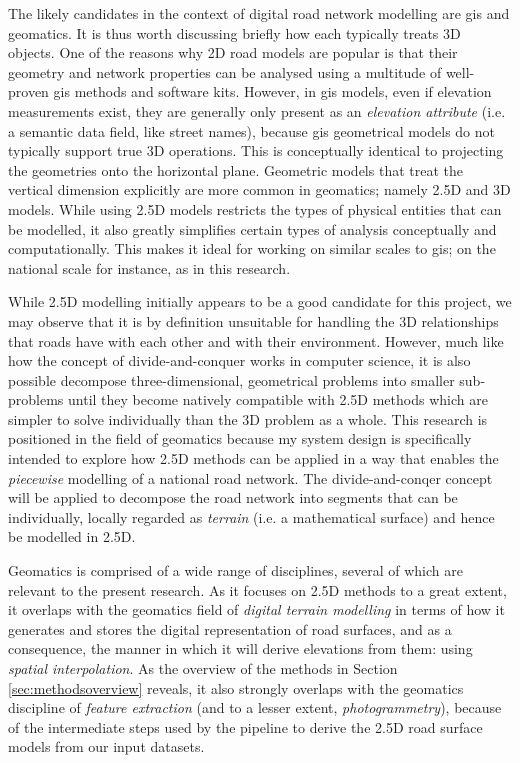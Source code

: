 The likely candidates in the context of digital road network modelling are \ac{gis} and geomatics. It is thus worth discussing briefly how each typically treats 3D objects. One of the reasons why 2D road models are popular is that their geometry and network properties can be analysed using a multitude of well-proven \ac{gis} methods and software kits. However, in \ac{gis} models, even if elevation measurements exist, they are generally only present as an \textit{elevation attribute} (i.e. a semantic data field, like street names), because \ac{gis} geometrical models do not typically support true 3D operations. This is conceptually identical to projecting the geometries onto the horizontal plane. Geometric models that treat the vertical dimension explicitly are more common in geomatics; namely 2.5D and 3D models. While using 2.5D models restricts the types of physical entities that can be modelled, it also greatly simplifies certain types of analysis conceptually and computationally. This makes it ideal for working on similar scales to \ac{gis}; on the national scale for instance, as in this research.

While 2.5D modelling initially appears to be a good candidate for this project, we may observe that it is by definition unsuitable for handling the 3D relationships that roads have with each other and with their environment. However, much like how the concept of divide-and-conquer works in computer science, it is also possible decompose three-dimensional, geometrical problems into smaller sub-problems until they become natively compatible with 2.5D methods which are simpler to solve individually than the 3D problem as a whole. This research is positioned in the field of geomatics because my system design is specifically intended to explore how 2.5D methods can be applied in a way that enables the \textit{piecewise} modelling of a national road network. The divide-and-conqer concept will be applied to decompose the road network into segments that can be individually, locally regarded as \textit{terrain} (i.e. a mathematical surface) and hence be modelled in 2.5D.

Geomatics is comprised of a wide range of disciplines, several of which are relevant to the present research. As it focuses on 2.5D methods to a great extent, it overlaps with the geomatics field of \textit{digital terrain modelling} in terms of how it generates and stores the digital representation of road surfaces, and as a consequence, the manner in which it will derive elevations from them: using \textit{spatial interpolation}. As the overview of the methods in Section \ref{sec:methodsoverview} reveals, it also strongly overlaps with the geomatics discipline of \textit{feature extraction} (and to a lesser extent, \textit{photogrammetry}), because of the intermediate steps used by the pipeline to derive the 2.5D road surface models from our input datasets.

